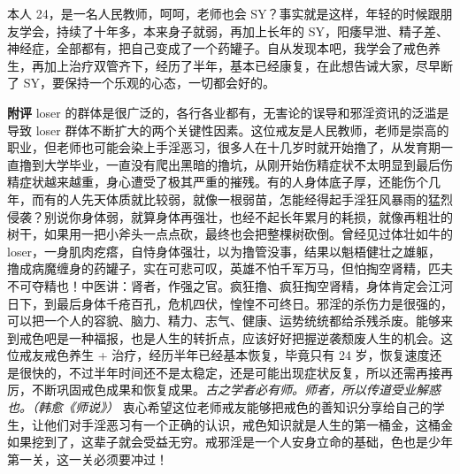 \begin{case}
    本人 24，是一名人民教师，呵呵，老师也会 SY？事实就是这样，年轻的时候跟朋友学会，持续了十年多，本来身子就弱，再加上长年的 SY，阳痿早泄、精子差、神经症，全部都有，把自己变成了一个药罐子。自从发现本吧，我学会了戒色养生，再加上治疗双管齐下，经历了半年，基本已经康复，在此想告诫大家，尽早断了 SY，要保持一个乐观的心态，一切都会好的。

    \textbf{附评} loser 的群体是很广泛的，各行各业都有，无害论的误导和邪淫资讯的泛滥是导致 loser 群体不断扩大的两个关键性因素。这位戒友是人民教师，老师是崇高的职业，但老师也可能会染上手淫恶习，很多人在十几岁时就开始撸了，从发育期一直撸到大学毕业，一直没有爬出黑暗的撸坑，从刚开始伤精症状不太明显到最后伤精症状越来越重，身心遭受了极其严重的摧残。有的人身体底子厚，还能伤个几年，而有的人先天体质就比较弱，就像一根弱苗，怎能经得起手淫狂风暴雨的猛烈侵袭？别说你身体弱，就算身体再强壮，也经不起长年累月的耗损，就像再粗壮的树干，如果用一把小斧头一点点砍，最终也会把整棵树砍倒。曾经见过体壮如牛的 loser，一身肌肉疙瘩，自恃身体强壮，以为撸管没事，结果以魁梧健壮之雄躯，撸成病魔缠身的药罐子，实在可悲可叹，英雄不怕千军万马，但怕掏空肾精，匹夫不可夺精也！中医讲：肾者，作强之官。疯狂撸、疯狂掏空肾精，身体肯定会江河日下，到最后身体千疮百孔，危机四伏，惶惶不可终日。邪淫的杀伤力是很强的，可以把一个人的容貌、脑力、精力、志气、健康、运势统统都给杀残杀废。能够来到戒色吧是一种福报，也是人生的转折点，应该好好把握逆袭颓废人生的机会。这位戒友戒色养生 + 治疗，经历半年已经基本恢复，毕竟只有 24 岁，恢复速度还是很快的，不过半年时间还不是太稳定，还是可能出现症状反复，所以还需再接再厉，不断巩固戒色成果和恢复成果。\textit{古之学者必有师。师者，所以传道受业解惑也。（韩愈《师说》）} 衷心希望这位老师戒友能够把戒色的善知识分享给自己的学生，让他们对手淫恶习有一个正确的认识，戒色知识就是人生的第一桶金，这桶金如果挖到了，这辈子就会受益无穷。戒邪淫是一个人安身立命的基础，色也是少年第一关，这一关必须要冲过！
\end{case}

